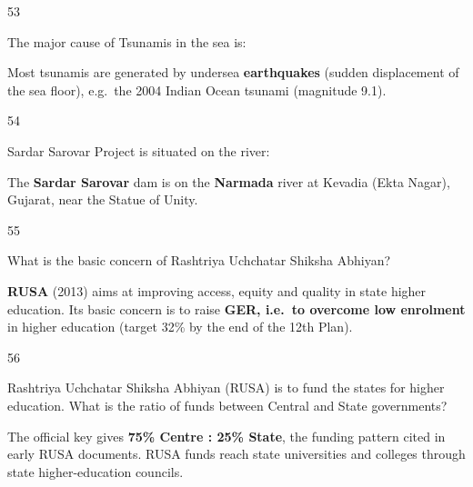 \begin{question}{53}
{The major cause of Tsunamis in the sea is:\par}
\begin{explain}
Most tsunamis are generated by undersea \textbf{earthquakes} (sudden displacement of the sea floor), e.g.\ the 2004 Indian Ocean tsunami (magnitude 9.1).
\end{explain}
\end{question}

\begin{question}{54}
{Sardar Sarovar Project is situated on the river:\par}
\begin{explain}
The \textbf{Sardar Sarovar} dam is on the \textbf{Narmada} river at Kevadia (Ekta Nagar), Gujarat, near the Statue of Unity.
\end{explain}
\end{question}

\begin{question}{55}
{What is the basic concern of Rashtriya Uchchatar Shiksha Abhiyan?\par}
\begin{explain}
\textbf{RUSA} (2013) aims at improving access, equity and quality in state higher education. Its basic concern is to raise \textbf{GER, i.e.\ to overcome low enrolment} in higher education (target 32\% by the end of the 12th Plan).
\end{explain}
\end{question}

\begin{question}{56}
{Rashtriya Uchchatar Shiksha Abhiyan (RUSA) is to fund the states for higher education. What is the ratio of funds between Central and State governments?\par}
\begin{explain}
The official key gives \textbf{75\% Centre : 25\% State}, the funding pattern cited in early RUSA documents. RUSA funds reach state universities and colleges through state higher-education councils.
\end{explain}
\end{question}

